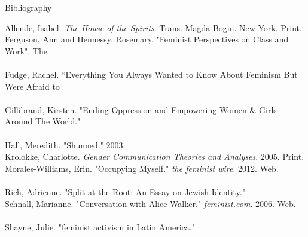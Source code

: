 \documentclass[12pt,a4paper]{article}
\begin{document}
	\newpage
	\noindent
	\centerline{Bibliography}
	Allende, Isabel. \textit{The House of the Spirits}. Trans. Magda Bogin. New York. Print.
	\\
	Ferguson, Ann and Hennessy, Rosemary. "Feminist Perspectives on Class and Work". The
		\\
	\\
	Fudge, Rachel. ``Everything You Always Wanted to Know About Feminism But Were Afraid to
		\\
	\\
	Gillibrand, Kirsten. "Ending Oppression and Empowering Women \& Girls Around The World."
		\\
	\\
	Hall, Meredith. "Shunned." 2003.
	\\ 
	Krolokke, Charlotte. \textit{Gender Communication Theories and Analyses}. 2005.
		Print.
	\\
	Morales-Williams, Erin. "Occupying Myself." \textit{the feminist wire}. 2012. Web.
		\\
	\\
	Rich, Adrienne. "Split at the Root: An Essay on Jewish Identity."
	\\
	Schnall, Marianne. "Conversation with Alice Walker." \textit{feminist.com}. 2006.
		Web. \\
	\\
	Shayne, Julie. "feminist activism in Latin America."
\end{document}
